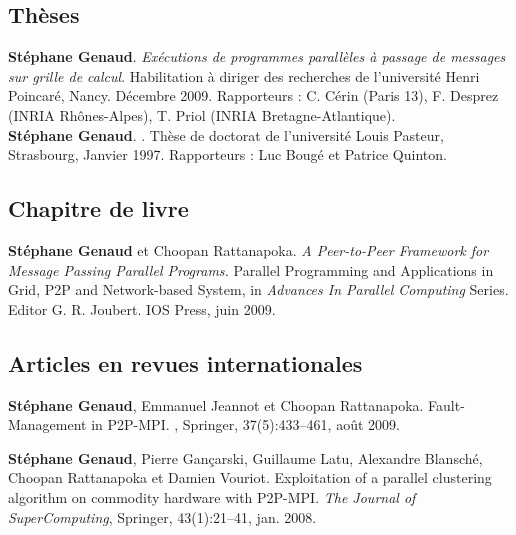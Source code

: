 \documentclass[11pt]{article}
\begin{document}
\small

\begin{thebibliography}{99}

\subsection*{Thèses}

\textbf{Stéphane Genaud}.
\newblock 
{\em Exécutions de programmes parallèles à passage de messages sur grille de 
calcul}.
\newblock 
Habilitation à diriger des recherches de l'université Henri Poincaré, 
Nancy. Décembre 2009.
\newblock 
Rapporteurs : C. Cérin (Paris 13), F. Desprez (INRIA Rhônes-Alpes), 
T. Priol (INRIA Bretagne-Atlantique).\\[2mm]

\textbf{Stéphane Genaud}.
.
\newblock Thèse de doctorat de l'université Louis Pasteur, Strasbourg, Janvier 1997.
\newblock Rapporteurs : Luc Bougé et Patrice Quinton. 

\subsection*{Chapitre de livre}

\textbf{Stéphane Genaud} et Choopan Rattanapoka.
\newblock 
\emph{A Peer-to-Peer Framework for Message Passing Parallel Programs.}
\newblock 
Parallel Programming and Applications in Grid, P2P and Network-based System,
in {\em Advances In Parallel Computing} Series. Editor G. R. Joubert.
IOS Press, juin 2009. 
 

\subsection*{Articles en revues internationales}

\setlength{\itemsep}{1.5mm}


\newblock \textbf{Stéphane Genaud}, Emmanuel Jeannot et Choopan Rattanapoka.
\newblock Fault-Management in P2P-MPI.
, Springer, 
37(5):433--461, août 2009.


\textbf{Stéphane Genaud}, Pierre Gançarski, Guillaume Latu, Alexandre Blansché, 
Choopan Rattanapoka et Damien Vouriot. \newblock Exploitation of a parallel 
clustering algorithm on commodity hardware with P2P-MPI.
\newblock 
{\em The Journal of SuperComputing}, Springer, 43(1):21--41, jan. 2008.



\end{thebibliography}
\end{document}
